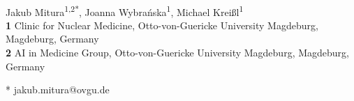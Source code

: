 \documentclass[10pt,letterpaper]{article}
\date{}
\begin{document}
\vspace*{0.2in}

\begin{flushleft}
{\Large
\textbf{} %
}
\newline
\\
Jakub Mitura\textsuperscript{1,2*},
Joanna Wybrańska\textsuperscript{1},
Michael Kreißl\textsuperscript{1}
\\
\bigskip
\textbf{1} Clinic for Nuclear Medicine, Otto-von-Guericke University Magdeburg, Magdeburg, Germany
\\
\textbf{2} AI in Medicine Group, Otto-von-Guericke University Magdeburg, Magdeburg, Germany
\\
\bigskip

%
%

* jakub.mitura@ovgu.de

\end{flushleft}
\end{document}
